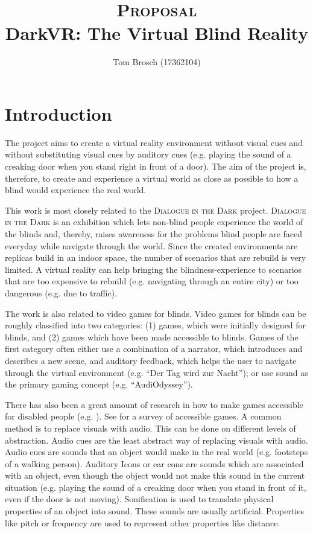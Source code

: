 \documentclass{assign}
\title{{\normalsize \textsc{Proposal}\\}DarkVR: The Virtual Blind Reality}
\author{Tom Brosch (17362104)}
\begin{document}
\maketitle


\section{Introduction}

The project aims to create a virtual reality environment without visual cues and
without substituting visual cues by auditory cues (e.g. playing the sound of a
creaking door when you stand right in front of a door). The aim of the project
is, therefore, to create and experience a virtual world as close as possible to
how a blind would experience the real world.

This work is most closely related to the \textsc{Dialogue in the Dark}
project\cite{dialog}. \textsc{Dialogue in the Dark} is an exhibition which lets
non-blind people experience the world of the blinds and, thereby, raises
awareness for the problems blind people are faced everyday while navigate
through the world. Since the created environments are replicas build in an
indoor space, the number of scenarios that are rebuild is very limited. A
virtual reality can help bringing the blindness-experience to scenarios that are
too expensive to rebuild (e.g. navigating through an entire city) or too
dangerous (e.g. due to traffic).

The work is also related to video games for blinds. Video games for blinds can
be roughly classified into two categories: (1) games, which were initially
designed for blinds, and (2) games which have been made accessible to blinds.
Games of the first category often either use a combination of a
narrator, which introduces and describes a new scene, and auditory feedback,
which helps the user to navigate through the virtual environment (e.g. ``Der Tag
wird zur Nacht''\cite{dertag}); or use sound as the primary gaming concept (e.g.
``AudiOdyssey''\cite{audiodyssey}).

There has also been a great amount of research in how to make games accessible
for disabled people (e.g. \cite{chile, terraformers, secondlife,
tankcommander}). See \cite{survey} for a survey of accessible games. A common
method is to replace visuals with audio. This can be done on different levels of
abstraction. Audio cues are the least abstract way of replacing visuals with
audio. Audio cues are sounds that an object would make in the real world (e.g.
footsteps of a walking person). Auditory Icons or ear cons are sounds which are
associated with an object, even though the object would not make this sound in
the current situation (e.g. playing the sound of a creaking door when you stand
in front of it, even if the door is not moving). Sonification is used to
translate physical properties of an object into sound. These sounds are usually
artificial. Properties like pitch or frequency are used to represent other
properties like distance.
\end{document}
